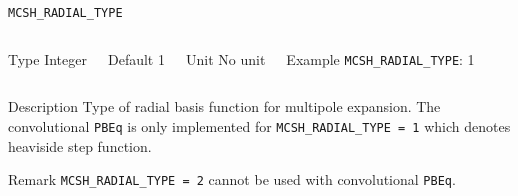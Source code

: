 	\begin{frame}[allowframebreaks]{\texttt{{MCSH\_RADIAL\_TYPE}}} \label{MCSH_RADIAL_TYPE}
	\vspace*{-12pt}
	\begin{columns}
	\begin{block}{Type}
	Integer
	\end{block}
	
	\begin{block}{Default}
	1
	\end{block}
	
	\begin{block}{Unit}
	No unit
	\end{block}
	
	\begin{block}{Example}
	\texttt{MCSH\_RADIAL\_TYPE}: 1
	\end{block}
	\end{columns}
	
	\begin{block}{Description}
	Type of radial basis function for multipole expansion. The convolutional \texttt{PBEq} is only implemented for \texttt{MCSH\_RADIAL\_TYPE = 1} which denotes heaviside step function. 
	\end{block}
	
	\begin{block}{Remark}
	\texttt{MCSH\_RADIAL\_TYPE = 2} cannot be used with convolutional \texttt{PBEq}.
	\end{block}
	\end{frame}
	
